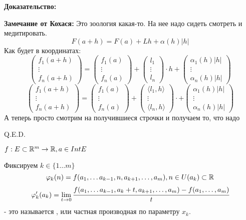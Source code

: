 \textbf{Доказательство:}

\textbf{Замечание от Кохася:} Это зоология какая-то. На нее надо сидеть смотреть и медитировать.
$$F(a+h) = F(a) + Lh + \alpha(h) |h|$$
Как будет в координатах:
$$\begin{pmatrix}
    f_1(a+h)\\
    \vdots\\
    f_n(a+h)
\end{pmatrix} = \begin{pmatrix}
    f_1(a) \\
    \vdots \\
    f_n(a)
\end{pmatrix}  + \begin{pmatrix}
    l_1\\
    \vdots\\
    l_n
\end{pmatrix}\cdot h + \begin{pmatrix}
    \alpha_1(h)|h|\\
    \vdots\\
    \alpha_n(h)|h|
\end{pmatrix}$$
$$\begin{pmatrix}
    f_1(a+h)\\
    \vdots\\
    f_n(a+h)
\end{pmatrix} = \begin{pmatrix}
    f_1(a) \\
    \vdots \\
    f_n(a)
\end{pmatrix}  + \begin{pmatrix}
    \langle l_1, h\rangle\\
    \vdots\\
     \langle l_n, h\rangle
\end{pmatrix}\cdot  + \begin{pmatrix}
    \alpha_1(h)|h|\\
    \vdots\\
    \alpha_n(h)|h|
\end{pmatrix}$$
А теперь просто смотрим на получившиеся строчки и получаем то, что надо

\hfill Q.E.D.

 $f: E \subset \mathbb{R}^m \rightarrow \mathbb{R}, a \in Int E$

Фиксируем $k \in \{1\ldots m\}$
$$\varphi_k(n) = f(a_1,\ldots a_{k-1}, n, a_{k+1},\ldots,a_m), n \in U(a_k)\subset \mathbb{R}$$
$$\varphi_k'(a_k) = \lim\limits_{t \rightarrow 0}\cfrac{ f(a_1,\ldots a_{k-1}, a_k + t, a_{k+1},\ldots,a_m) -  f(a_1,\ldots ,a_m)}{t} $$
- это называется , или частная производная по параметру $x_k$. 

